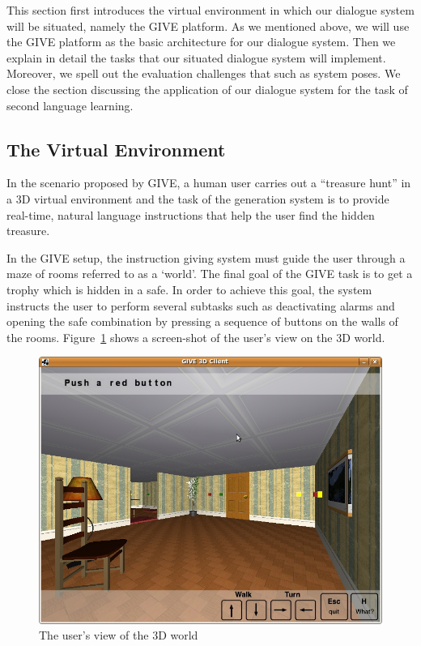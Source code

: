 This section first introduces the virtual environment in which our dialogue
system will be situated, namely the GIVE platform. As we mentioned above, we
will use the GIVE platform as the basic architecture for our dialogue system.  
Then we explain in detail the tasks that our situated dialogue system will
implement. Moreover, we spell out the evaluation challenges that such as system
poses. We close the section discussing the application of our dialogue system
for the task of second language learning. 

\subsection{The Virtual Environment}

In the scenario proposed by GIVE, a
human user carries out a ``treasure hunt'' in a 3D virtual environment
and the task of the generation system is to provide real-time, natural
language instructions that help the user find the hidden treasure.

In the GIVE setup, the instruction giving system must guide the user
through a maze of rooms referred to as a `world'. The final
goal of the GIVE task is to get a trophy which is hidden in a safe. In
order to achieve this goal, the system instructs the user to perform
several subtasks such as deactivating alarms and opening the safe
combination by pressing a sequence of buttons on the walls of the
rooms. Figure~\ref{3d-world} shows a screen-shot of the user's view on
the 3D world.

\begin{figure}[h]
\begin{center}
\includegraphics[width=1\linewidth]{give-3D.jpg} 
\end{center}
\caption{The user's view of the 3D world\label{3d-world}}
\end{figure}

